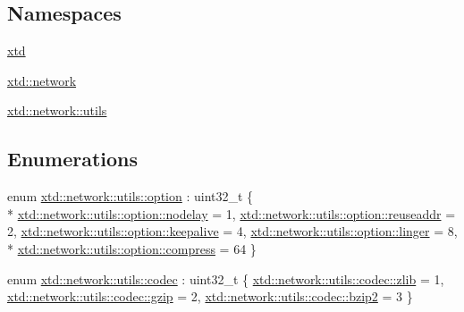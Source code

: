 \subsection*{Namespaces}
\begin{DoxyCompactItemize}
\item 
 \hyperlink{namespacextd}{xtd}
\item 
 \hyperlink{namespacextd_1_1network}{xtd\+::network}
\item 
 \hyperlink{namespacextd_1_1network_1_1utils}{xtd\+::network\+::utils}
\end{DoxyCompactItemize}
\subsection*{Enumerations}
\begin{DoxyCompactItemize}
\item 
enum \hyperlink{namespacextd_1_1network_1_1utils_a0acc888a3cdabdadb91fe832ea196a4f}{xtd\+::network\+::utils\+::option} \+: uint32\+\_\+t \{ \\*
\hyperlink{namespacextd_1_1network_1_1utils_a0acc888a3cdabdadb91fe832ea196a4faf0f888198330ff09558650aace4343e3}{xtd\+::network\+::utils\+::option\+::nodelay} = 1, 
\hyperlink{namespacextd_1_1network_1_1utils_a0acc888a3cdabdadb91fe832ea196a4fa087d20314d2967622b76fbf7ce91ebf2}{xtd\+::network\+::utils\+::option\+::reuseaddr} = 2, 
\hyperlink{namespacextd_1_1network_1_1utils_a0acc888a3cdabdadb91fe832ea196a4fa797919b5a9c95dfae9b06cf3086e40c1}{xtd\+::network\+::utils\+::option\+::keepalive} = 4, 
\hyperlink{namespacextd_1_1network_1_1utils_a0acc888a3cdabdadb91fe832ea196a4fafa1711bb276806d1f1808dbb0e31018a}{xtd\+::network\+::utils\+::option\+::linger} = 8, 
\\*
\hyperlink{namespacextd_1_1network_1_1utils_a0acc888a3cdabdadb91fe832ea196a4fa390626c545194d0f20a704589b190994}{xtd\+::network\+::utils\+::option\+::compress} = 64
 \}
\item 
enum \hyperlink{namespacextd_1_1network_1_1utils_a3ac1216ad2037b366cc1f9051a978161}{xtd\+::network\+::utils\+::codec} \+: uint32\+\_\+t \{ \hyperlink{namespacextd_1_1network_1_1utils_a3ac1216ad2037b366cc1f9051a978161a7a990d405d2c6fb93aa8fbb0ec1a3b23}{xtd\+::network\+::utils\+::codec\+::zlib} = 1, 
\hyperlink{namespacextd_1_1network_1_1utils_a3ac1216ad2037b366cc1f9051a978161a749cadba7b2ed8d4a2aaa91a9cb1896c}{xtd\+::network\+::utils\+::codec\+::gzip} = 2, 
\hyperlink{namespacextd_1_1network_1_1utils_a3ac1216ad2037b366cc1f9051a978161a03ce1ba314f367fdd09887fc8f60578b}{xtd\+::network\+::utils\+::codec\+::bzip2} = 3
 \}
\end{DoxyCompactItemize}
